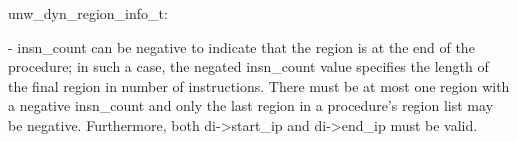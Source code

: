 unw\_dyn\_region\_info\_t:

        - insn_count can be negative to indicate that the region is
          at the end of the procedure; in such a case, the negated
          insn_count value specifies the length of the final region
          in number of instructions.  There must be at most one region
          with a negative insn_count and only the last region in a
          procedure's region list may be negative.  Furthermore, both
          di->start\_ip and di->end\_ip must be valid.
